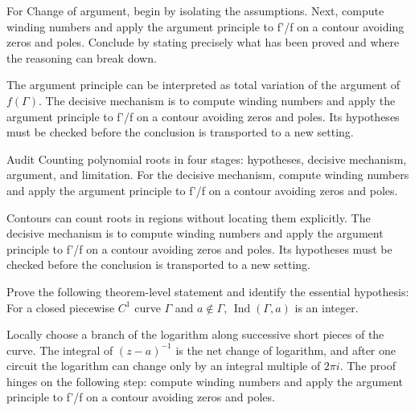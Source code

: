 \begin{problem}\label{prob:iv12-problem-06}
For Change of argument, begin by isolating the assumptions. Next, compute winding numbers and apply the argument principle to f'/f on a contour avoiding zeros and poles. Conclude by stating precisely what has been proved and where the reasoning can break down.
\end{problem}
\begin{solution}
The argument principle can be interpreted as total variation of the argument of $f(\Gamma)$. The decisive mechanism is to compute winding numbers and apply the argument principle to f'/f on a contour avoiding zeros and poles. Its hypotheses must be checked before the conclusion is transported to a new setting.
\end{solution}

\begin{problem}\label{prob:iv12-problem-07}
Audit Counting polynomial roots in four stages: hypotheses, decisive mechanism, argument, and limitation. For the decisive mechanism, compute winding numbers and apply the argument principle to f'/f on a contour avoiding zeros and poles.
\end{problem}
\begin{solution}
Contours can count roots in regions without locating them explicitly. The decisive mechanism is to compute winding numbers and apply the argument principle to f'/f on a contour avoiding zeros and poles. Its hypotheses must be checked before the conclusion is transported to a new setting.
\end{solution}

\begin{problem}\label{prob:iv12-problem-08}
Prove the following theorem-level statement and identify the essential hypothesis: For a closed piecewise $C^1$ curve $\Gamma$ and $a\notin\Gamma$, $\operatorname{Ind}(\Gamma,a)$ is an integer.
\end{problem}
\begin{solution}
Locally choose a branch of the logarithm along successive short pieces of the curve. The integral of $(z-a)^{-1}$ is the net change of logarithm, and after one circuit the logarithm can change only by an integral multiple of $2\pi i$. The proof hinges on the following step: compute winding numbers and apply the argument principle to f'/f on a contour avoiding zeros and poles.
\end{solution}

